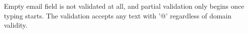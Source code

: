 \begin{tcolorbox}[colback=gray!10, colframe=gray!40, title=Actual Behavior]
Empty email field is not validated at all, and partial validation only begins once typing starts. The validation accepts any text with '@' regardless of domain validity.
\end{tcolorbox}

